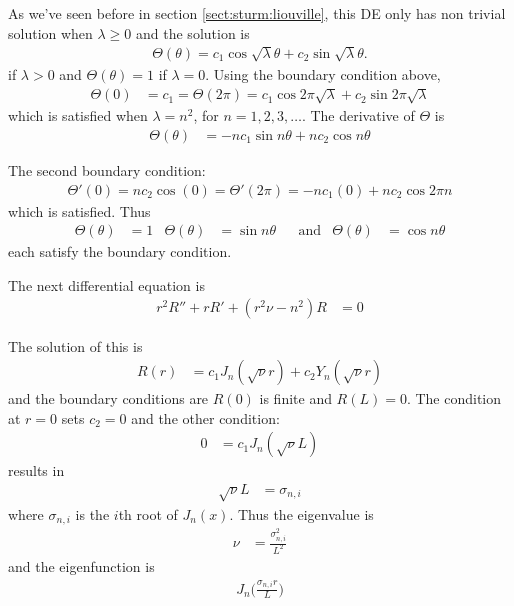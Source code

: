 As we've seen before in section \ref{sect:sturm:liouville}, this DE only has non trivial solution when $\lambda \geq 0$ and the solution is 
\begin{align*}
\Theta(\theta)  = c_1 \cos \sqrt{\lambda} \theta + c_2 \sin \sqrt{\lambda} \theta. 
\end{align*}
if $\lambda >0$ and $\Theta(\theta)=1$ if $\lambda=0$.  
%
Using the boundary condition above, 
\begin{align*}
\Theta (0) & = c_1 = \Theta(2\pi) = c_1 \cos 2\pi\sqrt{\lambda} + c_2 \sin 2\pi \sqrt{\lambda}
\end{align*}
which is satisfied when $\lambda = n^2$, for $n=1,2,3,\ldots$.  The derivative of $\Theta$ is
%
\begin{align*}
\Theta(\theta) & = -n c_1 \sin n \theta + n c_2 \cos n\theta
\end{align*}

The second boundary condition:
%
\begin{align*}
\Theta'(0) = n c_2 \cos (0) = \Theta'(2\pi) = -n c_1(0) + n c_2 \cos 2\pi n 
\end{align*}
which is satisfied.  Thus
%
\begin{align*}
\Theta(\theta) & = 1 & 
\Theta(\theta) &= \sin n \theta & & \text{and} & \Theta(\theta) & = \cos n \theta
\end{align*}
each satisfy the boundary condition.  

The next differential equation is
%
\begin{align*}
r^2 R''+ r R' + (r^2 \nu-n^2) R & = 0 
\end{align*}

The solution of this is
%
\begin{align*}
R(r) & = c_1 J_n(\sqrt{\nu} r) + c_2 Y_n(\sqrt{\nu} r)  
\end{align*}
and the boundary conditions are $R(0)$ is finite and $R(L)=0$.  The condition at $r=0$ sets $c_2=0$ and the other condition:
%
\begin{align*}
0 & = c_1 J_n(\sqrt{\nu}L) 
\end{align*}
results in
%
\begin{align*}
\sqrt{\nu} L & = \sigma_{n,i}
\end{align*}
where $\sigma_{n,i}$ is the $i$th root of $J_n(x)$.  Thus the eigenvalue is
%
\begin{align*}
\nu & = \frac{\sigma_{n,i}^2}{L^2} 
\end{align*}
and the eigenfunction is
%
\begin{align*}
J_n\biggl(\frac{\sigma_{n,i} r}{L} \biggr)
\end{align*}


